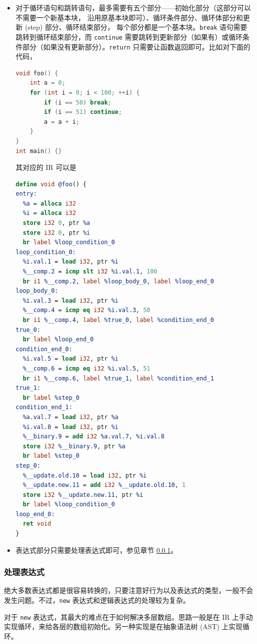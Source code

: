 \begin{itemize}
\item 对于循环语句和跳转语句，最多需要有五个部分——初始化部分（这部分可以不需要一个新基本块，
沿用原基本块即可）、循环条件部分、循环体部分和更新 (step) 部分、循环结束部分，
每个部分都是一个基本块。\texttt{break} 语句需要跳转到循环结束部分，而 \texttt{continue}
需要跳转到更新部分（如果有）或循环条件部分（如果没有更新部分）。\texttt{return}
只需要让函数返回即可。比如对下面的代码，
\begin{lstlisting}[language=C++]
void foo() {
    int a = 0;
    for (int i = 0; i < 100; ++i) {
        if (i == 50) break;
        if (i == 51) continue;
        a = a + i;
    }
}
int main() {}
\end{lstlisting}
其对应的 IR 可以是
\begin{lstlisting}[language=LLVM]
define void @foo() {
entry:
  %a = alloca i32
  %i = alloca i32
  store i32 0, ptr %a
  store i32 0, ptr %i
  br label %loop_condition_0
loop_condition_0:
  %i.val.1 = load i32, ptr %i
  %__comp.2 = icmp slt i32 %i.val.1, 100
  br i1 %__comp.2, label %loop_body_0, label %loop_end_0
loop_body_0:
  %i.val.3 = load i32, ptr %i
  %__comp.4 = icmp eq i32 %i.val.3, 50
  br i1 %__comp.4, label %true_0, label %condition_end_0
true_0:
  br label %loop_end_0
condition_end_0:
  %i.val.5 = load i32, ptr %i
  %__comp.6 = icmp eq i32 %i.val.5, 51
  br i1 %__comp.6, label %true_1, label %condition_end_1
true_1:
  br label %step_0
condition_end_1:
  %a.val.7 = load i32, ptr %a
  %i.val.8 = load i32, ptr %i
  %__binary.9 = add i32 %a.val.7, %i.val.8
  store i32 %__binary.9, ptr %a
  br label %step_0
step_0:
  %__update.old.10 = load i32, ptr %i
  %__update.new.11 = add i32 %__update.old.10, 1
  store i32 %__update.new.11, ptr %i
  br label %loop_condition_0
loop_end_0:
  ret void
}
\end{lstlisting}

\item 表达式部分只需要处理表达式即可，参见章节 \ref{AST-to-IR-expression}。
\end{itemize}

\subsubsection{处理表达式}\label{AST-to-IR-expression}

绝大多数表达式都是很容易转换的，只要注意好行为以及表达式的类型，一般不会发生问题。不过，\texttt{new}
表达式和逻辑表达式的处理较为复杂。

对于 \texttt{new} 表达式，其最大的难点在于如何解决多层数组。思路一般是在 IR
上手动实现循环，来给各层的数组初始化。另一种实现是在抽象语法树 (AST)
上实现循环。

